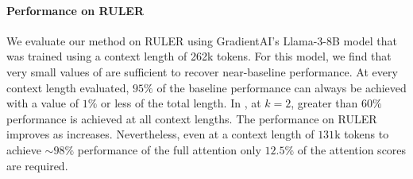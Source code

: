 \paragraph{\Topk Performance on RULER} 
We evaluate our method on RULER using GradientAI's Llama-3-8B model that was trained using a context length of 262k tokens. For this model, we find that very small values of \kk are sufficient to recover near-baseline performance. At every context length evaluated, $95\%$ of the baseline performance can always be achieved with a \kk value of $1\%$ or less of the total length. In , at $k=2$, greater than $60\%$ performance is achieved at all context lengths. The performance on RULER improves as \kk increases. Nevertheless, even at a context length of $131$k tokens to achieve $\sim 98\%$ performance of the full attention only $12.5\%$ of the attention scores are required.

